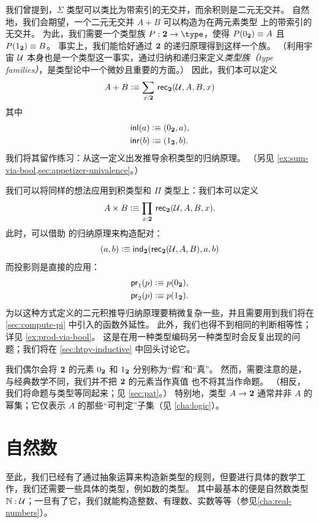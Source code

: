 我们曾提到，$\Sigma$ 类型可以类比为带索引的无交并，而余积则是二元无交并。
自然地，我们会期望，一个二元无交并 $A+B$ 可以构造为在两元素类型 \bool 上的带索引的无交并。
为此，我们需要一个类型族 $P:\bool\to\type$，使得 $P({0_{\mathbf{2}}})\equiv A$ 且 $P({1_{\mathbf{2}}})\equiv B$。
事实上，我们能恰好通过 $\mathbf{2}$ 的递归原理得到这样一个族。
%
（利用宇宙 $\mathcal{U}$ 本身也是一个类型这一事实，通过归纳和递归来定义\emph{类型族（type families）}，是类型论中一个微妙且重要的方面。）
因此，我们本可以定义
%
\[ A + B \defeq \sm{x:\bool} \rec{\bool}(\UU,A,B,x) \]
其中
\begin{align*}
  {\mathsf{inl}}(a) &\vcentcolon\equiv ({0_{\mathbf{2}}},a), \\
  {\mathsf{inr}}(b) &\vcentcolon\equiv ({1_{\mathbf{2}}},b).
\end{align*}
我们将其留作练习：从这一定义出发推导余积类型的归纳原理。
（另见 \cref{ex:sum-via-bool,sec:appetizer-univalence}。）

我们可以将同样的想法应用到积类型和 $\Pi$ 类型上：我们本可以定义
\[ A \times B \defeq \prd{x:\bool}\rec{\bool}(\UU,A,B,x). \]
此时，可以借助 \bool 的归纳原理来构造配对：
\[ (a,b) \vcentcolon\equiv \mathsf{ind}_{\mathbf{2}}(\mathsf{rec}_{\mathbf{2}}(\mathcal{U},A,B),a,b) \]
而投影则是直接的应用：
\begin{align*}
  \mathsf{pr}_{1}(p) &\vcentcolon\equiv p({0_{\mathbf{2}}}), \\
  \mathsf{pr}_{2}(p) &\vcentcolon\equiv p({1_{\mathbf{2}}}).
\end{align*}
为以这种方式定义的二元积推导归纳原理要稍微复杂一些，并且需要用到我们将在 \cref{sec:compute-pi} 中引入的函数外延性。
此外，我们也得不到相同的判断相等性；详见 \cref{ex:prod-via-bool}。
这是在用一种类型编码另一种类型时会反复出现的问题；我们将在 \cref{sec:htpy-inductive} 中回头讨论它。

我们偶尔会将 $\mathbf{2}$ 的元素 ${0_{\mathbf{2}}}$ 和 ${1_{\mathbf{2}}}$ 分别称为``假''和``真''。
然而，需要注意的是，与经典数学不同，我们并不把 $\mathbf{2}$ 的元素当作真值
%
也不将其当作命题。
（相反，我们将命题与类型等同起来；见 \cref{sec:pat}。）
特别地，类型 $A \to \mathbf{2}$ 通常并非 $A$ 的幂集；它仅表示 $A$ 的那些``可判定''子集（见 \cref{cha:logic}）。
%

%

\section{自然数}
\label{sec:inductive-types}

%
%
%
至此，我们已经有了通过抽象运算来构造新类型的规则，但要进行具体的数学工作，我们还需要一些具体的类型，例如数的类型。
其中最基本的便是自然数类型 $\mathbb{N} : \mathcal{U}$；一旦有了它，我们就能构造整数、有理数、实数等等（参见\cref{cha:real-numbers}）。

